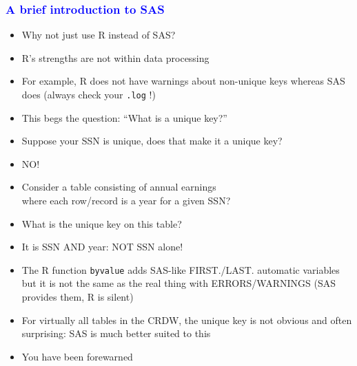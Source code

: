 \documentclass[11pt,pdftex,dvipsnames,usenames]{beamer}
\begin{document}
\begin{frame}[fragile]\frametitle{\bf\textcolor{blue}{A brief
introduction to SAS}}

\begin{itemize}
\item Why not just use R instead of SAS?
\item R's strengths are not within data processing
\item For example, R does not have warnings about non-unique keys
whereas SAS does (always check your \texttt{.log} !)
\item This begs the question: ``What is a unique key?''
\item Suppose your SSN is unique, does that make it a unique key?
\item NO! %
\item Consider a table consisting of annual earnings\\ 
where each row/record is a year for a given SSN?
\item What is the unique key on this table?
\item It is SSN AND year: NOT SSN alone!
\item The R function \texttt{byvalue} adds SAS-like
FIRST./LAST. automatic variables but it is not the same as the real
thing with ERRORS/WARNINGS (SAS provides them, R is silent)
\item For virtually all tables in the CRDW, the unique key
is not obvious and often surprising: SAS is much better suited to this
\item You have been forewarned
\end{itemize}

\end{frame}
\end{document}
